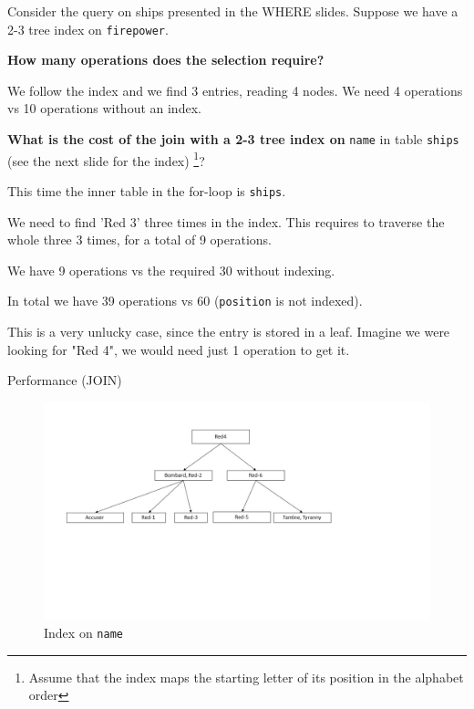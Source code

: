\documentclass{beamer}
\begin{document}
\begin{slide}{
\item Consider the query on ships presented in the WHERE slides. Suppose we have a 2-3 tree index on \texttt{firepower}.
\item \textbf{How many operations does the selection require?}
\pause
\item We follow the index and we find 3 entries, reading 4 nodes. We need 4 operations vs 10 operations without an index.
}\end{slide}

\begin{slide}{
\item \textbf{What is the cost of the join with a 2-3 tree index on} \texttt{name} in table \texttt{ships} (see the next slide for the index) \footnote{Assume that the index maps the starting letter of its position in the alphabet order}?
\pause
\item This time the inner table in the for-loop is \texttt{ships}.
\item We need to find 'Red 3' three times in the index. This requires to traverse the whole three 3 times, for a total of 9 operations.
\item We have 9 operations vs the required 30 without indexing.
\item In total we have 39 operations vs 60 (\texttt{position} is not indexed).
\item This is a very unlucky case, since the entry is stored in a leaf. Imagine we were looking for "Red 4", we would need just 1 operation to get it.
}\end{slide}

\begin{frame}{Performance (JOIN)}
\begin{figure}
\centering
\includegraphics[scale=0.3]{img/tree1}
\caption{Index on \texttt{name}}
\end{figure}
\end{frame}
\end{document}
